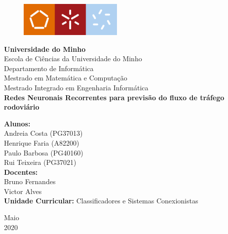 \documentclass[a4paper, 12pt]{article}
\begin{document}
\begin{titlepage}
	\begin{center}
		
		\begin{figure}[!htb]
			\centering
			\includegraphics[width=5cm]{uminho}
			\label{Rotulo}
		\end{figure}
		
		\textbf{\Huge{Universidade do Minho}}\\
		\vspace{10pt}
		\large{Escola de Ciências da Universidade do Minho}\\
		\large{Departamento de Informática}\\
		\vspace{10pt}
		\normalsize{Mestrado em Matemática e Computação}\\
		\normalsize{Mestrado Integrado em Engenharia Informática}\\
		\vspace{2cm}
		\textbf{\Large{Redes Neuronais Recorrentes para previsão do fluxo de tráfego rodoviário}}\\
		\vspace{2cm}
	\end{center}
	
	\begin{center}
		\textbf{Alunos:}
		\vspace{0,1cm}
		\\Andreia Costa (PG37013) \\Henrique Faria (A82200) \\ Paulo Barbosa (PG40160) \\ Rui Teixeira (PG37021)\\
		\vspace{1cm}
		\textbf{Docentes:} \\
		Bruno Fernandes\\ 
		Victor Alves \\
		\vspace{1cm}
		\textbf{Unidade Curricular:} Classificadores e Sistemas Conexionistas
	\end{center}
	\vspace{1cm}
	\begin{center}
		Maio\\
		2020
	\end{center}
\end{titlepage}
\end{document}
